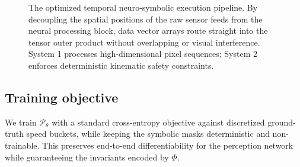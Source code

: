 \begin{figure}[!t]
{%
    }
    \caption{The optimized temporal neuro-symbolic execution pipeline. By decoupling the spatial positions of the raw sensor feeds from the neural processing block, data vector arrays route straight into the tensor outer product without overlapping or visual interference. System 1 processes high-dimensional pixel sequences; System 2 enforces deterministic kinematic safety constraints.}
    \label{fig:arch}
\end{figure}

\subsection{Training objective}
We train $\mathcal{P}_\theta$ with a standard cross-entropy objective against discretized ground-truth speed buckets, while keeping the symbolic masks deterministic and non-trainable. This preserves end-to-end differentiability for the perception network while guaranteeing the invariants encoded by $\Phi$.